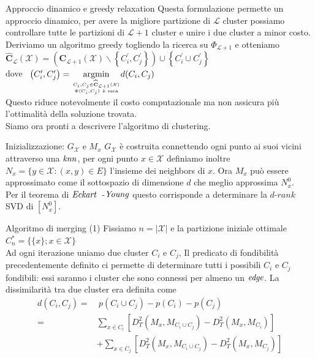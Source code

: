 \documentclass[usenames,dvipsnames,9pt]{beamer}
\theoremstyle{definition}
\begin{document}
\begin{frame}{Approccio dinamico e greedy relaxation}
Questa formulazione permette un approccio dinamico, per avere la migliore partizione di $\mathcal{L}$ cluster possiamo controllare tutte le partizioni di $\mathcal{L} + 1$ cluster e unire i due cluster a minor costo. \\
Deriviamo un algoritmo greedy togliendo la ricerca su $\Phi_{\mathcal{L}+1}$ e otteniamo
\vskip 0.05in
$\widehat{\mathbf{C}}_{\mathcal{L}}(\mathcal{X})=\left(\mathbf{C}_{\mathcal{L}+1}(\mathcal{X}) \backslash\left\{C_{i}^{\prime}, C_{j}^{\prime}\right\}\right) \cup\left\{C_{i}^{\prime} \cup C_{j}^{\prime}\right\}$ \\
dove \ $\left(C_{i}^{\prime}, C_{j}^{\prime}\right)=\underset{C_{i}, C_{j} \in \widehat{\mathbf{C}}_{\mathcal{L} + 1}(\mathcal{X}) \atop \Psi(C_i, C_j) \ \text{è vera}}{\operatorname{argmin}}d(C_{i}, C_{j})$ \\
Questo riduce notevolmente il costo computazionale ma non assicura più l'ottimalità della soluzione trovata. \\
Siamo ora pronti a descrivere l'algoritmo di clustering.
\end{frame}

\begin{frame}{Inizializzazione: $G_\mathcal{X}$ e $M_x$}
$G_\mathcal{X}$ è costruita connettendo ogni punto ai suoi vicini attraverso una $\it{knn}$, per ogni punto $x\in\mathcal{X}$
definiamo inoltre $N_x = \{y\in\mathcal{X} : \left( x, y \right) \in E \}$ l'insieme dei neighbors di $x$.
Ora $M_x$ può essere approssimato come il sottospazio di dimensione $d$ che meglio approssima $N^{0}_x$. \\
Per il teorema di $\it{Eckart}$\ -$\it{Young}$ questo corrisponde a determinare la $d$-$rank$ SVD di $\left[N^{0}_x\right]$.
\end{frame}

\begin{frame}{Algoritmo di merging (1)}
Fissiamo $n=|\mathcal{X}|$ e la partizione iniziale ottimale $C^{*}_n = \{\{x\}; x\in\mathcal{X}\}$ \\
Ad ogni iterazione uniamo due cluster $C_i$ e $C_j$, Il predicato di fondibilità precedentemente definito ci permette
di determinare tutti i possibili $C_i$ e $C_j$ fondibili: essi saranno i cluster che sono connessi per almeno un $\it{edge}$.
La dissimilarità tra due cluster era definita come \\
\begin{equation*}
\begin{aligned}
d(C_i, C_j) =& \ p(C_i\cup C_j) - p(C_i) - p(C_j) \\
=& \sum_{x \in C_{i}} \left[D_{T}^{2}\left(M_{x}, M_{C_{i} \cup C_{j}}\right)- D_{T}^{2}\left(M_{x}, M_{C_{i}}\right)\right] \\
&+\sum_{x \in C_{j}} \left[D_{T}^{2}\left(M_{x}, M_{C_{i} \cup C_{j}}\right)-D_{T}^{2}\left(M_{x}, M_{C_{j}}\right)\right]
\end{aligned}
\end{equation*}
\end{frame}
\end{document}
